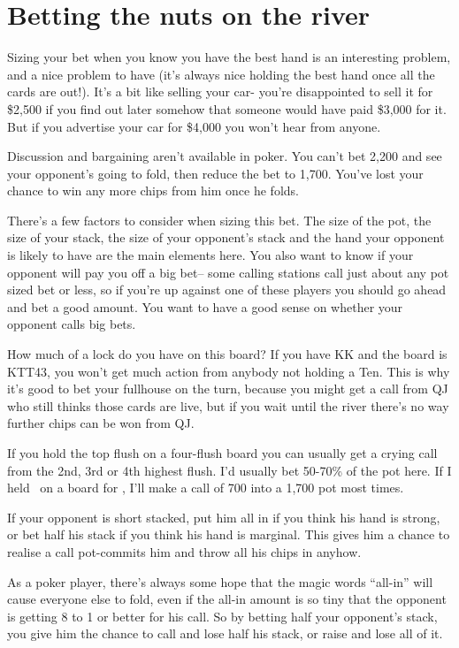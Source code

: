 \section{Betting the nuts on the river}

Sizing your bet when you know you have the best hand is an interesting problem,
and a nice problem to have (it's always nice holding the best hand once all
the cards are out!). It's a bit like selling your car- you're disappointed to
sell it for \$2,500 if you find out later somehow that someone would have paid
\$3,000 for it. But if you advertise your car for \$4,000 you won't hear from
anyone.

Discussion and bargaining aren't available in poker. You can't bet 2,200 and
see your opponent's going to fold, then reduce the bet to 1,700. You've lost
your chance to win any more chips from him once he folds.

There's a few factors to consider when sizing this bet. The size of the pot, the
size of your stack, the size of your opponent's stack and the hand your
opponent is likely to have are the main elements here. You also want to know
if your opponent will pay you off a big bet-- some calling stations call just
about any pot sized bet or less, so if you're up against one of these players
you should go ahead and bet a good amount. You want to have a good sense
on whether your opponent calls big bets.

How much of a lock do you have on this board? If you have KK and the
board is KTT43, you won't get much action from anybody not holding a Ten.
This is why it's good to bet your fullhouse on the turn, because you might
get a call from QJ who still thinks those cards are live, but if you wait
until the river there's no way further chips can be won from QJ.

If you hold the top flush on a four-flush board you can usually get a crying
call from the 2nd, 3rd or 4th highest flush. I'd usually bet 50-70\% of the
pot here. If I held \Jh\tens\ on a board for \Ah\tenh\nines\fiveh\fourh, I'll
make a call of 700 into a 1,700 pot most times.

If your opponent is short stacked, put him all in if you think his hand is
strong, or bet half his stack if you think his hand is marginal. This
gives him a chance to realise a call pot-commits him and throw all his
chips in anyhow.

As a poker player, there's always some hope that the magic words ``all-in''
will cause everyone else to fold, even if the all-in amount is so tiny
that the opponent is getting 8 to 1 or better for his call. So by betting
half your opponent's stack, you give him the chance to call and lose half
his stack, or raise and lose all of it.

